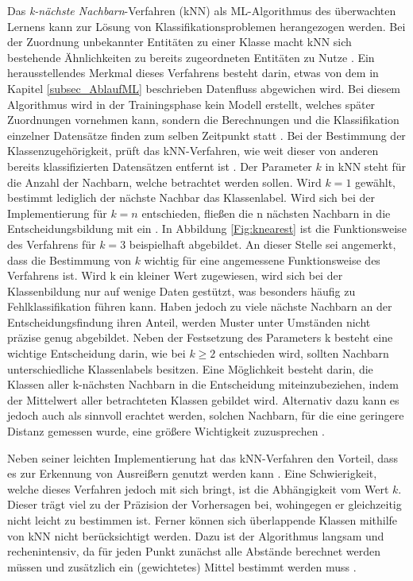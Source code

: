 Das \emph{k-nächste Nachbarn}-Verfahren (kNN) als ML-Algorithmus des überwachten Lernens kann zur Lösung von Klassifikationsproblemen herangezogen werden. Bei der Zuordnung unbekannter Entitäten zu einer Klasse macht kNN sich bestehende Ähnlichkeiten zu bereits zugeordneten Entitäten zu Nutze \cite{Matzka.2021}. Ein herausstellendes Merkmal dieses Verfahrens besteht darin, etwas von dem in Kapitel \ref{subsec_AblaufML} beschrieben Datenfluss abgewichen wird. Bei diesem Algorithmus wird in der Trainingsphase kein Modell erstellt, welches später Zuordnungen vornehmen kann, sondern die Berechnungen und die Klassifikation einzelner Datensätze finden zum selben Zeitpunkt statt \cite{Verdhan.2020, Matzka.2021}. Bei der Bestimmung der Klassenzugehörigkeit, prüft das kNN-Verfahren, wie weit dieser von anderen bereits klassifizierten Datensätzen entfernt ist \cite{Verdhan.2020}. Der Parameter $k$ in kNN steht für die Anzahl der Nachbarn, welche betrachtet werden sollen. Wird $k=1$ gewählt, bestimmt lediglich der nächste Nachbar das Klassenlabel. Wird sich bei der Implementierung für $k=n$ entschieden, fließen die n nächsten Nachbarn in die Entscheidungsbildung mit ein \cite{Matzka.2021}. In Abbildung \ref{Fig:knearest} ist die Funktionsweise des Verfahrens für $k=3$ beispielhaft abgebildet. An dieser Stelle sei angemerkt, dass die Bestimmung von $k$ wichtig für eine angemessene Funktionsweise des Verfahrens ist. Wird k ein kleiner Wert zugewiesen, wird sich bei der Klassenbildung nur auf wenige Daten gestützt, was besonders häufig zu Fehlklassifikation führen kann. Haben jedoch zu viele nächste Nachbarn an der Entscheidungsfindung ihren Anteil, werden Muster unter Umständen nicht präzise genug abgebildet. Neben der Festsetzung des Parameters k besteht eine wichtige Entscheidung darin, wie bei $k\geq 2$ entschieden wird, sollten Nachbarn unterschiedliche Klassenlabels besitzen. Eine Möglichkeit besteht darin, die Klassen aller k-nächsten Nachbarn in die Entscheidung miteinzubeziehen, indem der Mittelwert aller betrachteten Klassen gebildet wird. Alternativ dazu kann es jedoch auch als sinnvoll erachtet werden, solchen Nachbarn, für die eine geringere Distanz gemessen wurde, eine größere Wichtigkeit zuzusprechen \cite{Ng.2018}.

Neben seiner leichten Implementierung hat das kNN-Verfahren den Vorteil, dass es zur Erkennung von Ausreißern genutzt werden kann \cite{Ng.2018, Verdhan.2020}. Eine Schwierigkeit, welche dieses Verfahren jedoch mit sich bringt, ist die Abhängigkeit vom Wert $k$. Dieser trägt viel zu der Präzision der Vorhersagen bei, wohingegen er gleichzeitig nicht leicht zu bestimmen ist. Ferner können sich überlappende Klassen mithilfe von kNN nicht berücksichtigt werden. Dazu ist der Algorithmus langsam und rechenintensiv, da für jeden Punkt zunächst alle Abstände berechnet werden müssen und zusätzlich ein (gewichtetes) Mittel bestimmt werden muss \cite{Verdhan.2020}.

